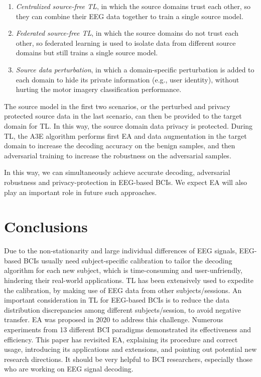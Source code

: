 \documentclass[journal]{IEEEtran}
\begin{document}
\begin{enumerate}
\item \emph{Centralized source-free TL}, in which the source domains trust each other, so they can combine their EEG data together to train a single source model.
\item \emph{Federated source-free TL}, in which the source domains do not trust each other, so federated learning is used to isolate data from different source domains but still trains a single source model.
\item \emph{Source data perturbation}, in which a domain-specific perturbation is added to each domain to hide its private information (e.g., user identity), without hurting the motor imagery classification performance.
\end{enumerate}
The source model in the first two scenarios, or the perturbed and privacy protected source data in the last scenario, can then be provided to the target domain for TL. In this way, the source domain data privacy is protected. During TL, the A3E algorithm performs first EA and data augmentation in the target domain to increase the decoding accuracy on the benign samples, and then adversarial training to increase the robustness on the adversarial samples.

In this way, we can simultaneously achieve accurate decoding, adversarial robustness and privacy-protection in EEG-based BCIs. We expect EA will also play an important role in future such approaches.


\section{Conclusions} \label{sect:conclusions}

Due to the non-stationarity and large individual differences of EEG signals, EEG-based BCIs usually need subject-specific calibration to tailor the decoding algorithm for each new subject, which is time-consuming and user-unfriendly, hindering their real-world applications. TL has been extensively used to expedite the calibration, by making use of EEG data from other subjects/sessions. An important consideration in TL for EEG-based BCIs is to reduce the data distribution discrepancies among different subjects/session, to avoid negative transfer. EA was proposed in 2020 to address this challenge. Numerous experiments from 13 different BCI paradigms demonstrated its effectiveness and efficiency. This paper has revisited EA, explaining its procedure and correct usage, introducing its applications and extensions, and pointing out potential new research directions. It should be very helpful to BCI researchers, especially those who are working on EEG signal decoding.
\end{document}
